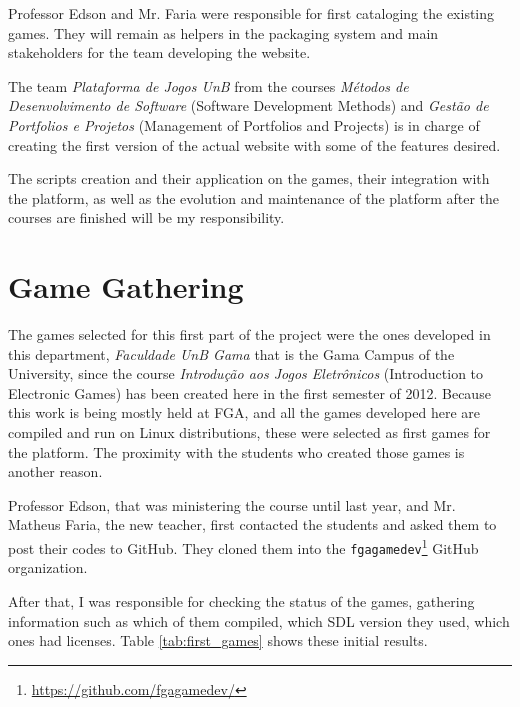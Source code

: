 Professor Edson and Mr. Faria were responsible for first cataloging the existing games. They will remain as helpers in the packaging system and main stakeholders for the team developing the website.

The team \textit{Plataforma de Jogos UnB} from the courses \textit{M\'etodos de Desenvolvimento de Software} (Software Development Methods) and \textit{Gest\~ao de Portfolios e Projetos} (Management of Portfolios and Projects) is in charge of creating the first version of the actual website with some of the features desired.

The scripts creation and their application on the games, their integration with the platform, as well as the evolution and maintenance of the platform after the courses are finished will be my responsibility.


\section{Game Gathering}
\label{sec:game_gathering}

The games selected for this first part of the project were the ones developed in this department, \textit{Faculdade UnB Gama} that is the Gama Campus of the University, since the course \textit{Introdu\c{c}\~ao aos Jogos Eletr\^onicos} (Introduction to Electronic Games) has been created here in the first semester of 2012. Because this work is being mostly held at FGA, and all the games developed here are compiled and run on Linux distributions, these were selected as first games for the platform. The proximity with the students who created those games is another reason.

Professor Edson, that was ministering the course until last year, and Mr. Matheus Faria, the new teacher, first contacted the students and asked them to post their codes to GitHub. They cloned them into the \texttt{fgagamedev}\footnote{ \href{https://github.com/fgagamedev}{https://github.com/fgagamedev/} } GitHub organization.

After that, I was responsible for checking the status of the games, gathering information such as which of them compiled, which SDL version they used, which ones had licenses. Table \ref{tab:first_games} shows these initial results.


